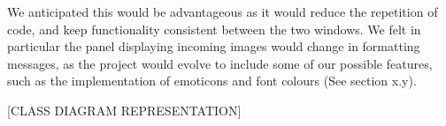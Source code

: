 We anticipated this would be advantageous as it would reduce the repetition of code, and keep functionality consistent between the two windows. We felt in particular the panel displaying incoming images would change in formatting messages, as the project would evolve to include some of our possible features, such as the implementation of emoticons and font colours (See section x.y).  

[CLASS DIAGRAM REPRESENTATION]








\subsubsection{}





